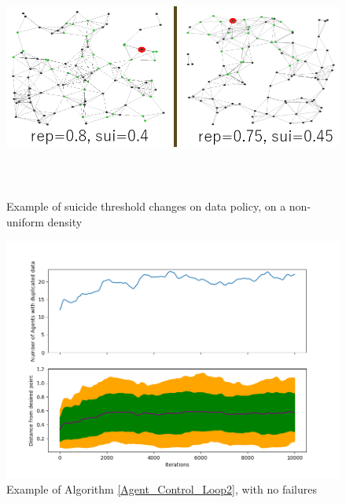 \documentclass{UoYCSproject}
\begin{document}
\begin{figure}[htb]
\label{fig:Data9}
\begin{center}
\centering
\includegraphics[width=\linewidth, height=8cm]{"./Rep_Sui_no_uniform_no_mo.png"}
\caption{Example of suicide threshold changes on data policy, on a non-uniform density}
\end{center}
\end{figure}

\begin{figure}[htb]
\label{fig:Data10}
\begin{center}
\centering
\includegraphics[width=\linewidth, height=8cm]{"./New_Replication_Scheme_No_Death_0.8r_0.45s.png"}
\caption{Example of Algorithm \ref{Agent_Control_Loop2}, with no failures}
\end{center}
\end{figure}
\end{document}
